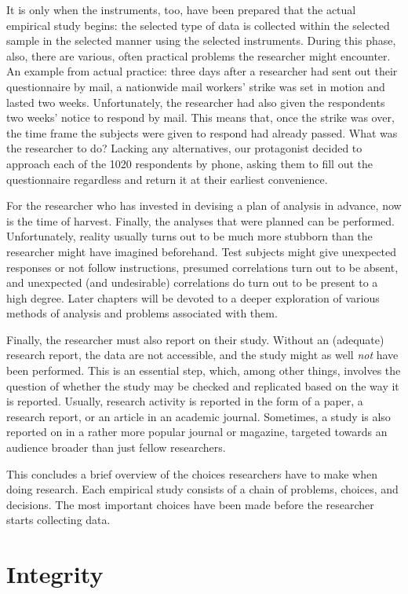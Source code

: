 \documentclass[
]{book}
\begin{document}
It is only when the instruments, too, have been prepared that the actual empirical study begins: the selected type of data is collected within the selected sample in the selected manner using the selected instruments. During this phase, also, there are various, often practical problems the researcher might encounter. An example from actual practice: three days after a researcher had sent out their questionnaire by mail, a nationwide mail workers' strike was set in motion and lasted two weeks. Unfortunately, the researcher had also given the respondents two weeks' notice to respond by mail. This means that, once the strike was over, the time frame the subjects were given to respond had already passed. What was the researcher to do? Lacking any alternatives, our protagonist decided to approach each of the 1020 respondents by phone, asking them to fill out the questionnaire regardless and return it at their earliest convenience.

For the researcher who has invested in devising a plan of analysis in advance, now is the time of harvest. Finally, the analyses that were planned can be performed. Unfortunately, reality usually turns out to be much more stubborn than the researcher might have imagined beforehand. Test subjects might give unexpected responses or not follow instructions, presumed correlations turn out to be absent, and unexpected (and undesirable) correlations do turn out to be present to a high degree. Later chapters will be devoted to a deeper exploration of various methods of analysis and problems associated with them.

Finally, the researcher must also report on their study. Without an (adequate) research report, the data are not accessible, and the study might as well \emph{not} have been performed. This is an essential step, which, among other things, involves the question of whether the study may be checked and replicated based on the way it is reported. Usually, research activity is reported in the form of a paper, a research report, or an article in an academic journal. Sometimes, a study is also reported on in a rather more popular journal or magazine, targeted towards an audience broader than just fellow researchers.

This concludes a brief overview of the choices researchers have to make when doing research. Each empirical study consists of a chain of problems, choices, and decisions. The most important choices have been made before the researcher starts collecting data.

\hypertarget{ch:integrity}{%
\chapter{Integrity}\label{ch:integrity}}
\end{document}
